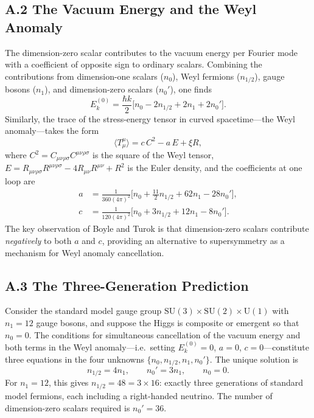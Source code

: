 \documentclass[12pt,a4paper]{article}
\theoremstyle{remark}
\begin{document}
\subsection*{A.2 The Vacuum Energy and the Weyl Anomaly}

The dimension-zero scalar contributes to the vacuum energy per Fourier mode with a
coefficient of opposite sign to ordinary scalars. Combining the contributions from
dimension-one scalars ($n_0$), Weyl fermions ($n_{1/2}$), gauge bosons ($n_1$), and
dimension-zero scalars ($n_0'$), one finds
\begin{equation}
  E_k^{(0)} = \frac{\hbar k}{2}\bigl[n_0 - 2n_{1/2} + 2n_1 + 2n_0'\bigr].
\end{equation}
Similarly, the trace of the stress-energy tensor in curved spacetime---the Weyl anomaly---takes
the form
\begin{equation}
  \langle T^\mu_\mu \rangle = c\,C^2 - a\,E + \xi R,
\end{equation}
where $C^2 = C_{\mu\nu\rho\sigma}C^{\mu\nu\rho\sigma}$ is the square of the Weyl tensor,
$E = R_{\mu\nu\rho\sigma}R^{\mu\nu\rho\sigma} - 4R_{\mu\nu}R^{\mu\nu} + R^2$ is the Euler
density, and the coefficients at one loop are
\begin{align}
  a &= \frac{1}{360(4\pi)^2}\bigl[n_0 + \tfrac{11}{2}n_{1/2} + 62n_1 - 28n_0'\bigr],\\
  c &= \frac{1}{120(4\pi)^2}\bigl[n_0 + 3n_{1/2} + 12n_1 - 8n_0'\bigr].
\end{align}
The key observation of Boyle and Turok is that dimension-zero scalars contribute
\emph{negatively} to both $a$ and $c$, providing an alternative to supersymmetry as a
mechanism for Weyl anomaly cancellation.

\subsection*{A.3 The Three-Generation Prediction}

Consider the standard model gauge group $\mathrm{SU}(3)\times\mathrm{SU}(2)\times\mathrm{U}(1)$
with $n_1 = 12$ gauge bosons, and suppose the Higgs is composite or emergent so that $n_0 = 0$.
The conditions for simultaneous cancellation of the vacuum energy and both terms in the
Weyl anomaly---i.e.\ setting $E_k^{(0)} = 0$, $a = 0$, $c = 0$---constitute three equations
in the four unknowns $\{n_0, n_{1/2}, n_1, n_0'\}$. The unique solution is
\begin{equation}
  n_{1/2} = 4n_1, \qquad n_0' = 3n_1, \qquad n_0 = 0.
\end{equation}
For $n_1 = 12$, this gives $n_{1/2} = 48 = 3 \times 16$: exactly three generations of standard
model fermions, each including a right-handed neutrino. The number of dimension-zero scalars
required is $n_0' = 36$.
\end{document}
